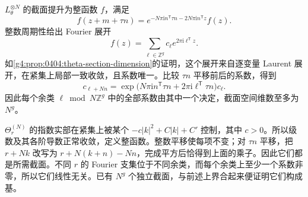 \begin{solution}
	\(L_\theta^{\otimes N}\) 的截面提升为整函数 \(f\)，满足
	\[
		f(z+m+\tau n)
		=e^{-N\pi\mathrm{i}n^{\mathsf T}\tau n
		-2N\pi\mathrm{i}n^{\mathsf T}z}f(z).
	\]
	整数周期性给出 Fourier 展开
	\[
		f(z)=\sum_{\ell\in\mathbb Z^g}c_\ell
		e^{2\pi\mathrm{i}\ell^{\mathsf T}z}.
	\]
	如\cref{g4:prop:0404:theta-section-dimension}的证明，这个展开来自逐变量 Laurent 展开，在紧集上局部一致收敛，且系数唯一。比较 \(\tau n\) 平移前后的系数，得到
	\[
		c_{\ell+Nn}
		=\exp\bigl(N\pi\mathrm{i}n^{\mathsf T}\tau n
		+2\pi\mathrm{i}\ell^{\mathsf T}\tau n\bigr)c_\ell.
	\]
	因此每个余类 \(\ell\bmod N\mathbb Z^g\) 中的全部系数由其中一个决定，截面空间维数至多为 \(N^g\)。

	\(\Theta_r^{(N)}\) 的指数实部在紧集上被某个 \(-c|k|^2+C|k|+C'\) 控制，其中 \(c>0\)。所以级数及其各阶导数正常收敛，定义整函数。整数平移使每项不变；对 \(\tau n\) 平移，把 \(r+Nk\) 改写为 \(r+N(k+n)-Nn\)，完成平方后恰得到上面的乘子。因此它们都是所需截面。不同 \(r\) 的 Fourier 支集位于不同余类，而每个余类上至少一个系数非零，所以它们线性无关。已有 \(N^g\) 个独立截面，与前述上界合起来便证明它们构成基。
\end{solution}

